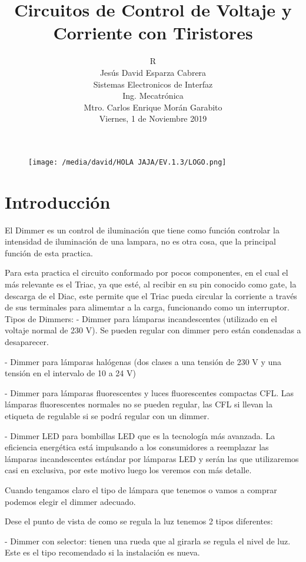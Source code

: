 \documentclass[12pt]{article}
\title{\textbf{Circuitos de Control de Voltaje y Corriente con Tiristores}}
\author{R\\ Jes\'us David Esparza Cabrera\\
		Sistemas Electronicos de Interfaz\\Ing. Mecatr\'onica\\Mtro. Carlos Enrique Mor\'an Garabito\\
		Viernes, 1 de Noviembre 2019}
\date{}
\begin{document}
\maketitle
\begin{figure}[htp]
\centering
\texttt{[image: /media/david/HOLA JAJA/EV.1.3/LOGO.png]}
\label{}
\end{figure}

\pagebreak

\section{Introducci\'on}

El Dimmer es un control de iluminaci\'on que tiene como funci\'on controlar la intensidad de iluminaci\'on de una lampara, no es otra cosa, que la principal funci\'on de esta practica.

Para esta practica el circuito conformado  por pocos componentes, en el cual el m\'as relevante es el Triac, ya que est\'e, al recibir en su pin conocido como gate, la descarga de el Diac, este permite que el Triac pueda circular la corriente a trav\'es de sus terminales para alimemtar a la carga, funcionando como un interruptor.\\ 
  Tipos de Dimmers:
 - Dimmer para lámparas incandescentes (utilizado en el voltaje normal de 230 V). Se pueden regular con dimmer pero están condenadas a desaparecer.

 - Dimmer para lámparas halógenas (dos clases a una tensión de 230 V y una tensión en el intervalo de 10 a 24 V)

 - Dimmer para lámparas fluorescentes y luces fluorescentes compactas CFL. Las lámparas fluorescentes normales no se pueden regular, las CFL si llevan la etiqueta de regulable si se podrá regular con un dimmer.

 - Dimmer LED para bombillas LED que es la tecnología más avanzada. La eficiencia energética está impulsando a los consumidores a reemplazar las lámparas incandescentes estándar por lámparas LED y serán las que utilizaremos casi en exclusiva, por este motivo luego los veremos con más detalle.

 Cuando tengamos claro el tipo de lámpara que tenemos o vamos a comprar podemos elegir el dimmer adecuado.

 Dese el punto de vista de como se regula la luz tenemos 2 tipos diferentes:

 - Dimmer con selector: tienen una rueda que al girarla se regula el nivel de luz. Este es el tipo recomendado si la instalación es nueva.
\end{document}
